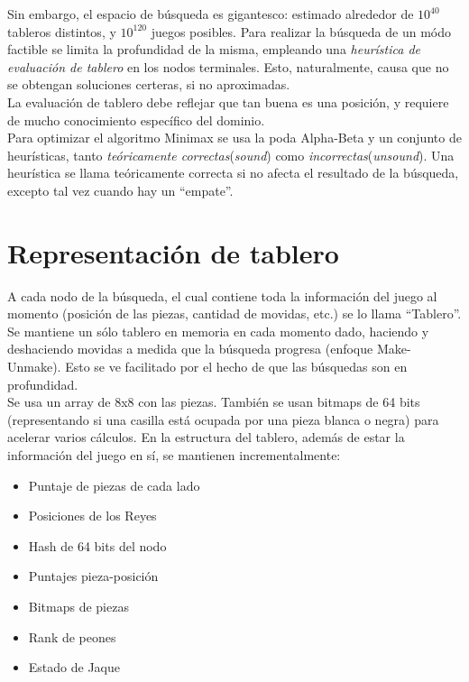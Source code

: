 \documentclass{article}
\begin{document}
\begin{multicols}{2}
Sin embargo, el espacio de búsqueda es gigantesco: estimado alrededor
de $10^{40}$ tableros distintos, y $10^{120}$ juegos posibles. Para
realizar la búsqueda de un módo factible se limita la profundidad de
la misma, empleando una \emph{heurística de evaluación de tablero}
en los nodos terminales. Esto, naturalmente, causa que no se obtengan
soluciones certeras, si no aproximadas.
\\

La evaluación de tablero debe reflejar que tan buena es una posición,
y requiere de mucho conocimiento específico del dominio.
\\

Para optimizar el algoritmo Minimax se usa la poda Alpha-Beta y un
conjunto de heurísticas, tanto \emph{teóricamente correctas}(\emph
{sound}) como \emph{incorrectas}(\emph{unsound}). Una heurística se
llama teóricamente correcta si no afecta el resultado de la búsqueda,
excepto tal vez cuando hay un ``empate''.

\section{Representación de tablero}

A cada nodo de la búsqueda, el cual contiene toda la información del
juego al momento (posición de las piezas, cantidad de movidas, etc.) se
lo llama ``Tablero''.
\\

Se mantiene un sólo tablero en memoria en cada momento dado, haciendo
y deshaciendo movidas a medida que la búsqueda progresa (enfoque
Make-Unmake). Esto se ve facilitado por el hecho de que las búsquedas
son en profundidad.
\\

Se usa un array de 8x8 con las piezas. También se usan bitmaps de
64 bits (representando si una casilla está ocupada por una pieza
blanca o negra) para acelerar varios cálculos. En la estructura del
tablero, además de estar la información del juego en sí, se mantienen
incrementalmente:

\begin{itemize}
\setlength\itemsep{0em}
\item Puntaje de piezas de cada lado
\item Posiciones de los Reyes
\item Hash de 64 bits del nodo
\item Puntajes pieza-posición
\item Bitmaps de piezas
\item Rank de peones
\item Estado de Jaque
\end{itemize}


\end{multicols}
\end{document}
